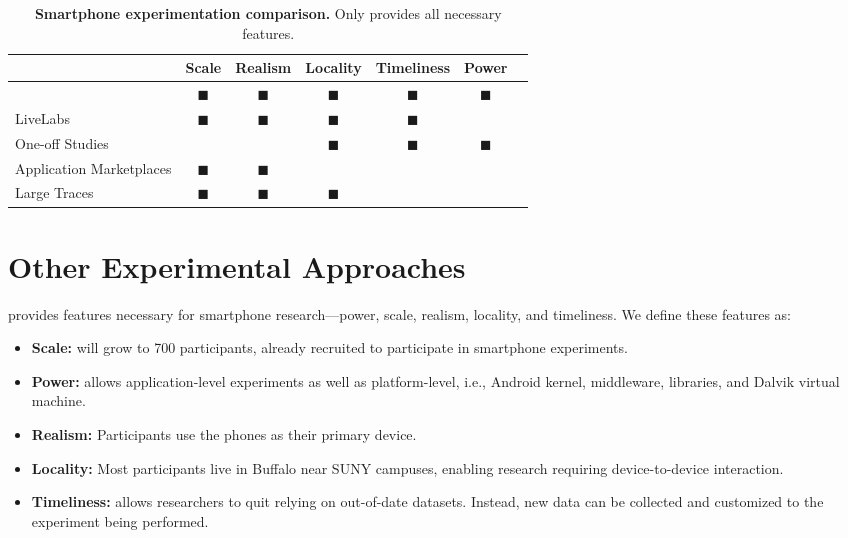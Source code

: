 \begin{table*}[t]
\begin{tabularx}{\textwidth}{Xcccccc}
& {\normalsize{\textbf{Scale}}} &
{\normalsize{\textbf{Realism}}} &
{\normalsize{\textbf{Locality}}} &
{\normalsize{\textbf{Timeliness}}} &
{\normalsize{\textbf{Power}}} \\
\toprule

{\large \PhoneLab{}}
& $\blacksquare$ & $\blacksquare$ & $\blacksquare$ & $\blacksquare$ & $\blacksquare$ \\
\toprule

LiveLabs &
$\blacksquare$ & $\blacksquare$ & $\blacksquare$ & $\blacksquare$ & & \\
\midrule

One-off Studies &
& & $\blacksquare$ & $\blacksquare$ & $\blacksquare$ \\
\midrule

Application Marketplaces &
$\blacksquare$ & $\blacksquare$ & & & \\
\midrule

Large Traces &
$\blacksquare$ & $\blacksquare$ & $\blacksquare$ & & \\

\end{tabularx}
\caption{\textbf{Smartphone experimentation comparison.} Only \PhoneLab{}
provides all necessary features.}
\label{tab:comparison}
\end{table*}

\section{Other Experimental Approaches}
\label{sec-comparison}

\PhoneLab{} provides features necessary for smartphone research---power,
scale, realism, locality, and timeliness. We define these features as:

\begin{itemize}[nosep]
\item {\bf Scale:} \PhoneLab{} will grow to 700 participants, already
recruited to participate in smartphone experiments.
\item {\bf Power:} \PhoneLab{} allows application-level experiments as well
as platform-level, i.e., Android kernel, middleware, libraries, and Dalvik
virtual machine.
\item {\bf Realism:} Participants use the phones as their primary device.
\item {\bf Locality:} Most participants live in Buffalo near SUNY campuses,
enabling research requiring device-to-device interaction.
\item {\bf Timeliness:} \PhoneLab{} allows researchers to quit relying on
out-of-date datasets. Instead, new data can be collected and customized to
the experiment being performed.
\end{itemize}

